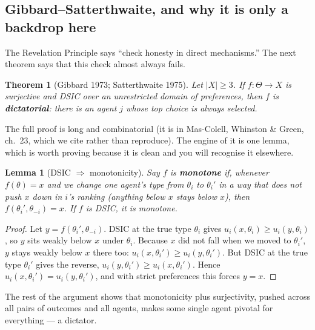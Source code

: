\documentclass[11pt,letterpaper]{article}
\theoremstyle{definition}
\theoremstyle{plain}
\newtheorem{theorem}{Theorem}[section]
\newtheorem{lemma}{Lemma}[section]
\theoremstyle{remark}
\newcommand{\type}{\theta}
\newcommand{\typespace}{\Theta}
\newcommand{\outcomes}{X}
\newcommand{\scf}{f}
\begin{document}
\subsection{Gibbard--Satterthwaite, and why it is only a backdrop here}

The Revelation Principle says ``check honesty in direct mechanisms.'' The next theorem says that
this check almost always fails.

\begin{theorem}[Gibbard 1973; Satterthwaite 1975]
\label{thm:gs}
Let $|\outcomes|\ge3$. If $\scf:\typespace\to\outcomes$ is surjective and DSIC over an
\emph{unrestricted} domain of preferences, then $\scf$ is \textbf{dictatorial}: there is an agent
$j$ whose top choice is always selected.
\end{theorem}

The full proof is long and combinatorial (it is in Mas-Colell, Whinston \& Green, ch.~23, which we
cite rather than reproduce). The engine of it is one lemma, which is worth proving because it is
clean and you will recognise it elsewhere.

\begin{lemma}[DSIC $\Rightarrow$ monotonicity]
\label{lem:mono}
Say $\scf$ is \textbf{monotone} if, whenever $\scf(\type)=x$ and we change one agent's type from
$\type_i$ to $\type_i'$ in a way that does not push $x$ down in $i$'s ranking (anything below $x$
stays below $x$), then $\scf(\type_i',\type_{-i})=x$. If $\scf$ is DSIC, it is monotone.
\end{lemma}

\begin{proof}
Let $y=\scf(\type_i',\type_{-i})$. DSIC at the true type $\type_i$ gives
$u_i(x,\type_i)\ge u_i(y,\type_i)$, so $y$ sits weakly below $x$ under $\type_i$. Because $x$ did
not fall when we moved to $\type_i'$, $y$ stays weakly below $x$ there too:
$u_i(x,\type_i')\ge u_i(y,\type_i')$. But DSIC at the true type $\type_i'$ gives the reverse,
$u_i(y,\type_i')\ge u_i(x,\type_i')$. Hence $u_i(x,\type_i')=u_i(y,\type_i')$, and with strict
preferences this forces $y=x$.
\end{proof}

\noindent The rest of the argument shows that monotonicity plus surjectivity, pushed across all
pairs of outcomes and all agents, makes some single agent pivotal for everything --- a dictator.
\end{document}
